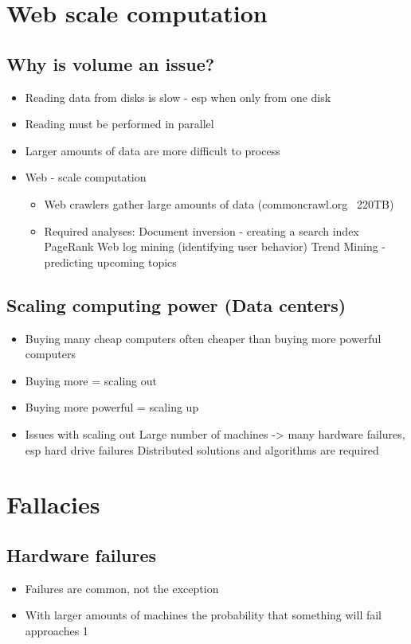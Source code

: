 \documentclass[10pt,a4paper]{scrreprt}
\begin{document}
\section{Web scale computation}
\subsection{Why is volume an issue?}
\begin{itemize}
	\item Reading data from disks is slow - esp when only from one disk
	\item Reading must be performed in parallel
	\item Larger amounts of data are more difficult to process
	\item Web - scale computation
	\begin{itemize}
		\item Web crawlers gather large amounts of data (commoncrawl.org ~220TB)
		\item Required analyses:
		\subitem Document inversion - creating a search index
		\subitem PageRank
		\subitem Web log mining (identifying user behavior)
		\subitem Trend Mining - predicting upcoming topics 
	\end{itemize}
\end{itemize}
\subsection{Scaling computing power (Data centers)}
\begin{itemize}
	\item Buying many cheap computers often cheaper than  buying more powerful computers
	\item Buying more = scaling out
	\item Buying more powerful = scaling up
	\item Issues with scaling out
	\subitem Large number of machines -> many hardware failures, esp hard drive failures
	\subitem Distributed solutions and algorithms are required
\end{itemize} 

\section{Fallacies}
\subsection{Hardware failures}
\begin{itemize}
	\item Failures are common, not the exception
	\item With larger amounts of machines the probability that something will fail approaches 1
\end{itemize}
\end{document}
